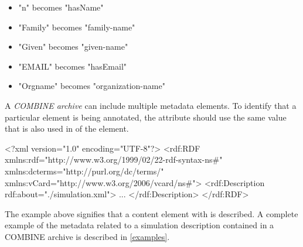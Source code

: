 \begin{itemize}
	\item  "n" becomes "hasName" 
	\item  "Family" becomes "family-name" 
	\item  "Given" becomes "given-name" 
	\item  "EMAIL" becomes "hasEmail" 
	\item  "Orgname" becomes "organization-name" 
\end{itemize}

A \textit{COMBINE archive} can include multiple metadata elements. To 
identify that a particular \Content element is being annotated, the 
 attribute should use the same value that is also used 
in  of the \Content element. 


\begin{example}
<?xml version="1.0" encoding="UTF-8"?>
<rdf:RDF xmlns:rdf="http://www.w3.org/1999/02/22-rdf-syntax-ns#" 
         xmlns:dcterms="http://purl.org/dc/terms/" 
				 xmlns:vCard="http://www.w3.org/2006/vcard/ns#">
   <rdf:Description rdf:about="./simulation.xml">
   ...
	 </rdf:Description>
</rdf:RDF>
\end{example}

The example above signifies that a content element with 
 is described. A complete example of 
the metadata related to a simulation description contained in a COMBINE 
archive is described in \ref{examples}. 



